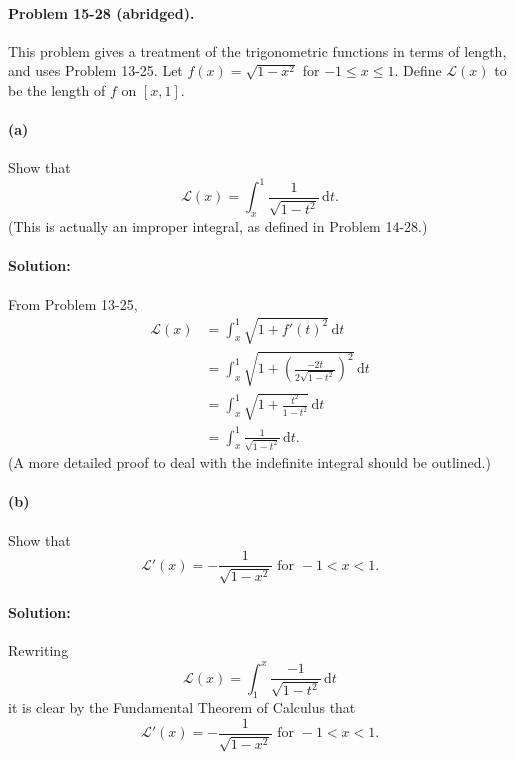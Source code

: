 \documentclass{article}
\begin{document}
\paragraph{Problem 15-28 (abridged).} This problem gives a treatment of the
trigonometric functions in terms of length, and uses Problem 13-25. Let $f(x) =
\sqrt{1 - x^2}$ for $-1 \leq x \leq 1$. Define $\mathcal{L}(x)$ to be the
length of $f$ on $[x, 1]$.

\paragraph{(a)} Show that \begin{equation*}
  \mathcal{L}(x) = \int_x^1 \frac{1}{\sqrt{1 - t^2}} \,\mathrm{d}t.
\end{equation*} (This is actually an improper integral, as defined in Problem
14-28.)

\paragraph{Solution:} From Problem 13-25, \begin{align*}
  \mathcal{L}(x)
    &= \int_x^1 \sqrt{1 + f'(t)^2} \,\mathrm{d}t \\
    &= \int_x^1 \sqrt{1 +
  \left(\frac{-2t}{2\sqrt{1 - t^2}}\right)^2} \,\mathrm{d}t \\
    &= \int_x^1 \sqrt{1 + \frac{t^2}{1 - t^2}} \,\mathrm{d}t \\
    &= \int_x^1 \frac{1}{\sqrt{1 - t^2}} \,\mathrm{d}t.
\end{align*} (A more detailed proof to deal with the indefinite integral should
be outlined.)

\paragraph{(b)} Show that \begin{equation*}
  \mathcal{L'}(x) = -\frac{1}{\sqrt{1 - x^2}} \text{ for } -1 < x < 1.
\end{equation*}

\paragraph{Solution:} Rewriting \begin{equation*}
  \mathcal{L}(x) = \int_1^x \frac{-1}{\sqrt{1 - t^2}} \,\mathrm{d}t
\end{equation*} it is clear by the Fundamental Theorem of Calculus that
\begin{equation*}
  \mathcal{L'}(x) = -\frac{1}{\sqrt{1 - x^2}} \text{ for } -1 < x < 1.
\end{equation*}
\end{document}
